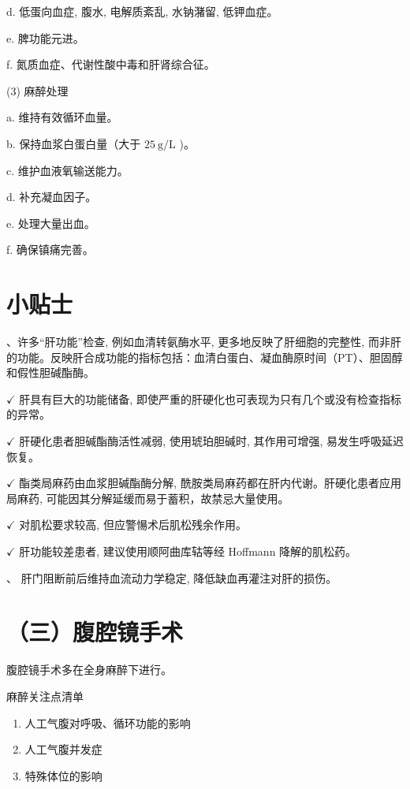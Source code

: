 \documentclass[10pt]{article}
\begin{document}
d. 低蛋向血症, 腹水, 电解质紊乱, 水钠潴留, 低钾血症。

e. 脾功能元进。

f. 氮质血症、代谢性酸中毒和肝肾综合征。

(3) 麻醉处理

a. 维持有效循环血量。

b. 保持血浆白蛋白量（大于 $25 \mathrm{~g} / \mathrm{L}$ )。

c. 维护血液氧输送能力。

d. 补充凝血因子。

e. 处理大量出血。

f. 确保镇痛完善。

\section*{小贴士}
、许多“肝功能”检查, 例如血清转氨酶水平, 更多地反映了肝细胞的完整性, 而非肝的功能。反映肝合成功能的指标包括：血清白蛋白、凝血酶原时间（PT）、胆固醇和假性胆碱酯酶。

$\checkmark$ 肝具有巨大的功能储备, 即使严重的肝硬化也可表现为只有几个或没有检查指标的异常。

$\checkmark$ 肝硬化患者胆碱酯酶活性减弱, 使用琥珀胆碱时, 其作用可增强, 易发生呼吸延迟恢复。

$\checkmark$ 酯类局麻药由血浆胆碱酯酶分解, 酰胺类局麻药都在肝内代谢。肝硬化患者应用局麻药, 可能因其分解延缓而易于蓄积，故禁忌大量使用。

$\checkmark$ 对肌松要求较高, 但应警愓术后肌松残余作用。

$\checkmark$ 肝功能较差患者, 建议使用顺阿曲库轱等经 Hoffmann 降解的肌松药。

$、$ 肝门阻断前后维持血流动力学稳定, 降低缺血再灌注对肝的损伤。

\section*{（三）腹腔镜手术}
腹腔镜手术多在全身麻醉下进行。

麻醉关注点清单

\begin{enumerate}
  \item 人工气腹对呼吸、循环功能的影响

  \item 人工气腹并发症

  \item 特殊体位的影响

\end{enumerate}
\end{document}
